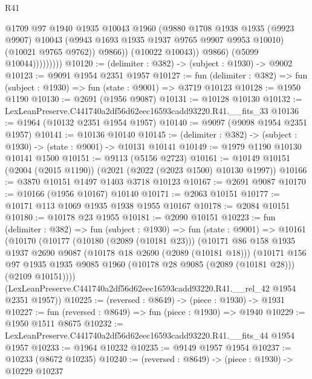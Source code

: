 \begin{lexlean}{R41}
\begin{coremodule}
                            @1709
                            @97
                            @1940
                            @1935
                            @10043
                            @1960
                            (@9880
                              @1708
                              @1938
                              @1935
                              (@9923 @9907)
                              @10043
                              (@9943 @1693 @1935 @1937 @9765 @9907 @9953 @10010)
                              (@10021 @9765 @9762))
                            @9866))
                        (@10022 @10043))
                      @9866)
                    (@5099 @10044)))))))))
@10120 := (delimiter : @382) -> (subject : @1930) -> @9002
@10123 := @9091 @1954 @2351 @1957
@10127 := fun (delimiter : @382) => fun (subject : @1930) => fun (state : @9001) => @3719 @10123
@10128 := @1950 @1190
@10130 := @2691 (@1956 @9087)
@10131 := @10128 @10130
@10132 := LexLeanPreserve.C441740a2df56d62eec16593cadd93220.R41.__fits_33
@10136 := @1964 (@10132 @2351 @1954 @1957)
@10140 := @9097 (@9098 @1954 @2351 @1957)
@10141 := @10136 @10140
@10145 := (delimiter : @382) -> (subject : @1930) -> (state : @9001) -> @10131 @10141
@10149 := @1979 @1190 @10130 @10141 @1500
@10151 := @9113 (@5156 @2723)
@10161 := @10149 @10151 (@2004 (@2015 @1190)) (@2021 (@2022 (@2023 @1500) @10130 @1997))
@10166 := @3870 @10151 @1497 @1403 @3718 @10123
@10167 := @2691 @9087
@10170 := @10166 (@1956 @10167) @10140
@10171 := @2063 @10151
@10177 := @10171 @113 @1069 @1935 @1938 @1955 @10167
@10178 := @2084 @10151
@10180 := @10178 @23 @1955
@10181 := @2090 @10151
@10223 := fun (delimiter : @382) =>
  fun (subject : @1930) =>
  fun (state : @9001) =>
  @10161
    (@10170
      (@10177
        (@10180 (@2089 (@10181 @23)))
        (@10171
          @86
          @158
          @1935
          @1937
          @2690
          @9087
          (@10178 @18 @2690 (@2089 (@10181 @18)))
          (@10171
            @156
            @97
            @1935
            @1935
            @9085
            @1960
            (@10178 @28 @9085 (@2089 (@10181 @28)))
            (@2109 @10151))))
      (LexLeanPreserve.C441740a2df56d62eec16593cadd93220.R41.__rel_42 @1954 @2351 @1957))
@10225 := (reversed : @8649) -> (piece : @1930) -> @1931
@10227 := fun (reversed : @8649) => fun (piece : @1930) => @1940
@10229 := @1950 @1511 @8675
@10232 := LexLeanPreserve.C441740a2df56d62eec16593cadd93220.R41.__fits_44 @1954 @1957
@10233 := @1964 @10232
@10235 := @9149 @1957 @1954
@10237 := @10233 (@8672 @10235)
@10240 := (reversed : @8649) -> (piece : @1930) -> @10229 @10237

\end{coremodule}
\end{lexlean}
